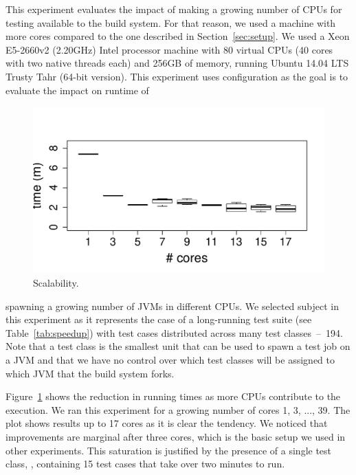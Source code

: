 This experiment evaluates the impact of making a growing number of
CPUs for testing available to the build system.  For that reason, we
used a machine with more cores compared to the one described in
Section~\ref{sec:setup}.  We used a Xeon E5-2660v2 (2.20GHz) Intel
processor machine with 80 virtual CPUs (40 cores with two native
threads each) and 256GB of memory, running Ubuntu 14.04 LTS Trusty
Tahr (64-bit version). This experiment uses configuration
\emph{\ForkSeq{}} as the goal is to evaluate the impact on runtime of
\begin{figure}%
  \centering
  \includegraphics[width=.25\textwidth]{R/scalability/scalability.pdf}
  \caption{\label{fig:scalability}Scalability.}
\end{figure}
spawning a growing number of JVMs in different CPUs.  We selected
subject \subjectScalability{} in this experiment as it represents the
case of a long-running test suite (see Table~\ref{tab:speedup}) with
test cases distributed across many test classes~--~194.  Note that a
test class is the smallest unit that can be used to spawn a test job
on a JVM and that we have no control over which test classes will be
assigned to which JVM that the build system forks.

Figure~\ref{fig:scalability} shows the reduction in running times as
more CPUs contribute to the execution.  We ran this experiment for a
growing number of cores 1, 3, ..., 39.  The plot shows results up to
17 cores as it is clear the tendency.  We noticed that improvements
are marginal after three cores, which is the basic setup we used in
other experiments.  This saturation is justified by the presence of a
single test class, , containing 15 test
cases that take over two minutes to run.


\begin{center}
\end{center}

